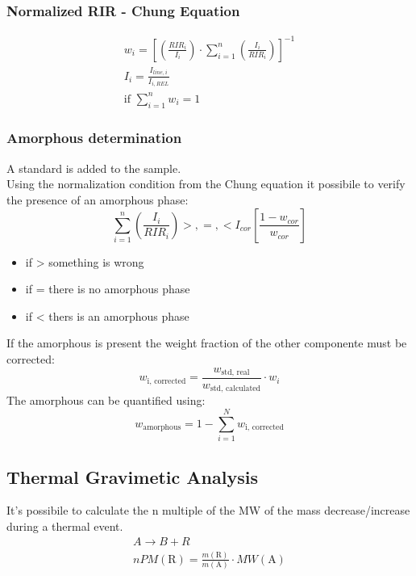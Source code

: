 \documentclass[../Master.tex]{subfiles}
\begin{document}
\begin{multicols*}{2}
	\subsubsection{Normalized RIR - Chung Equation}
	\begin{gather*}
		w_{i} =\left[ \left( \frac{RIR_{i}}{I_{i} } \right) \cdot \sum_{i=1} ^{n} \left( \frac{I_{i}}{RIR_{i} } \right)\right]^{-1} \\
		I_{i}= \frac{I_{line,i}}{I_{i, REL}} \\
		\text{if } \sum_{i=1}^{n} w_{i} = 1
	\end{gather*}
	\subsubsection{Amorphous determination}
	A standard is added to the sample.\\
	Using the normalization condition from the Chung equation it possibile to verify the presence of an amorphous phase:
	\[
		\sum_{i=1} ^{n} \left( \frac{I_{i}}{RIR_{i} } \right) >,=,< I_{cor}\left[ \frac{1-w_{cor} }{w_{cor} } \right]
	\]
	\begin{itemize}
		\item if > something is wrong
		\item if = there is no amorphous phase
		\item if < thers is an amorphous phase
	\end{itemize}
	If the amorphous is present the weight fraction of the other componente must be corrected:
	\[
		w_{\text{i, corrected}}  = \frac{w_{\text{std, real}} }{w_{\text{std, calculated}} } \cdot w_{i}
	\]
	The amorphous can be quantified using:
	\[
		w_{\text{amorphous}} = 1 - \sum_{i=1}^{N} w_{\text{i, corrected}}
	\]
	\subsection{Thermal Gravimetic Analysis}
	It's possibile to calculate the n multiple of the MW of the mass decrease/increase during a thermal event.
	\begin{gather*}
		A \to B + R \\
		nPM(\text{R}) = \frac{m(\text{R})}{m(\text{A}) } \cdot  MW(\text{A})
	\end{gather*}
\end{multicols*}
\end{document}
